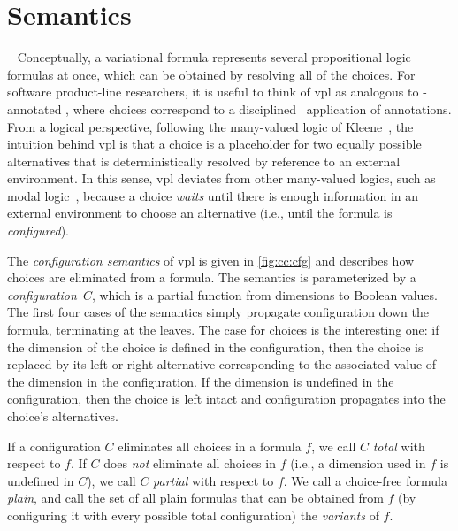 \section{Semantics}
~\label{section:semantics}
%
Conceptually, a variational formula represents several propositional logic
formulas at once, which can be obtained by resolving all of the choices. For
software product-line researchers, it is useful to think of \ac{vpl} as analogous
to -annotated \pl{}, where choices correspond to a
disciplined~\cite{LKA:AOSD11} application of  annotations.
%
From a logical perspective, following the many-valued logic of
Kleene~\cite{kleene1968introduction,Rescher1969-RESML}, the intuition behind
\ac{vpl} is that a choice is a placeholder for two equally possible alternatives
that is deterministically resolved by reference to an external environment.
%
In this sense, \ac{vpl} deviates from other many-valued logics, such as modal
logic~\cite{sep-logic-modal}, because a choice \emph{waits} until there is
enough information in an external environment to choose an alternative (i.e.,
until the formula is \emph{configured}).

The \emph{configuration semantics} of \ac{vpl} is given in
\autoref{fig:cc:cfg} and describes how choices are eliminated from a
formula. The semantics is parameterized by a \emph{configuration}\ $C$, which is
a partial function from dimensions to Boolean values.
%
The first four cases of the semantics simply propagate configuration down the
formula, terminating at the leaves. The case for choices is the interesting one:
if the dimension of the choice is defined in the configuration, then the choice
is replaced by its left or right alternative corresponding to the associated
value of the dimension in the configuration. If the dimension is undefined in
the configuration, then the choice is left intact and configuration propagates
into the choice's alternatives.

If a configuration $C$ eliminates all choices in a formula $f$, we call $C$
\emph{total} with respect to $f$. If $C$ does \emph{not} eliminate all choices
in $f$ (i.e., a dimension used in $f$ is undefined in $C$), we call $C$
\emph{partial} with respect to $f$.
%
We call a choice-free formula \emph{plain}, and call the set of all plain
formulas that can be obtained from $f$ (by configuring it with every possible
total configuration) the \emph{variants} of $f$.

